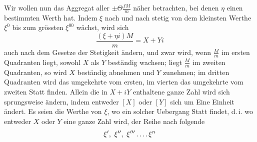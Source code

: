 Wir wollen nun das Aggregat aller $\pm\Theta\frac{fM}{m}$ näher betrachten, bei denen $\eta$ einen bestimmten Werth hat. Indem $\xi$ nach und nach stetig von dem kleinsten Werthe $\xi^0$ bis zum grössten $\xi^{00}$ wächst, wird sich
\[
\frac{(\xi+\eta i)M}{m}=X+Yi
\]
auch nach dem Gesetze der Stetigkeit ändern, und zwar wird, wenn $\frac{M}{m}$ im ersten Quadranten liegt, sowohl $X$ als $Y$ beständig wachsen; liegt $\frac{M}{m}$ im zweiten Quadranten, so wird $X$ beständig abnehmen und $Y$ zunehmen; im dritten Quadranten wird das umgekehrte vom ersten, im vierten das umgekehrte vom zweiten Statt finden. Allein die in $X+iY$ enthaltene ganze Zahl wird sich sprungsweise ändern, indem entweder $[X]$ oder $[Y]$ sich um Eine Einheit ändert. Es seien die Werthe von $\xi$, wo ein solcher Uebergang Statt findet, d.\,i. wo entweder $X$ oder $Y$ eine ganze Zahl wird, der Reihe nach folgende
\[
\xi',\ \xi'',\ \xi'''\mathinner{.\,.\,.\,.}\xi^n
\]

